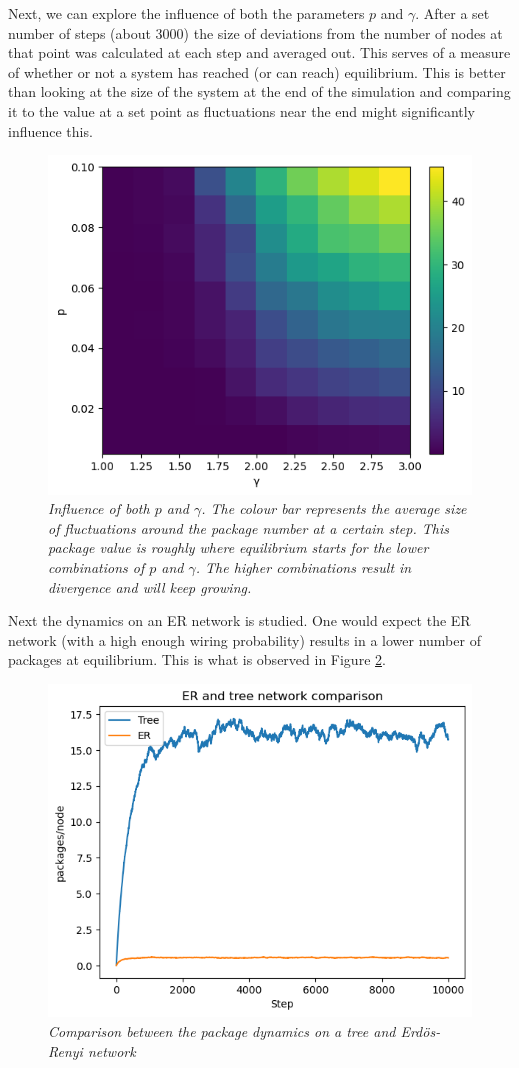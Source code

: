 Next, we can explore the influence of both the parameters $p$ and $\gamma$. After a set number of steps (about 3000) the size of deviations from the number of nodes at that point was calculated at each step and averaged out. This serves of a measure of whether or not a system has reached (or can reach) equilibrium. This is better than looking at the size of the system at the end of the simulation and comparing it to the value at a set point as fluctuations near the end might significantly influence this. 

\begin{figure}[H]
    \centering
    \includegraphics[width=0.7\linewidth]{images/parameter_space.png}
    \caption{\textit{Influence of both $p$ and $\gamma$. The colour bar represents the average size of fluctuations around the package number at a certain step. This package value is roughly where equilibrium starts for the lower combinations of $p$ and $\gamma$. The higher combinations result in divergence and will keep growing.}}
    \label{parameter_space}
\end{figure}

\noindent Next the dynamics on an ER network is studied. One would expect the ER network (with a high enough wiring probability) results in a lower number of packages at equilibrium. This is what is observed in Figure \ref{netw_comparison}.

\begin{figure}[H]
    \centering
    \includegraphics[width=0.7\linewidth]{images/netw_comparison.png}
    \caption{\textit{Comparison between the package dynamics on a tree and Erdös-Renyi network}}
    \label{netw_comparison}
\end{figure}

